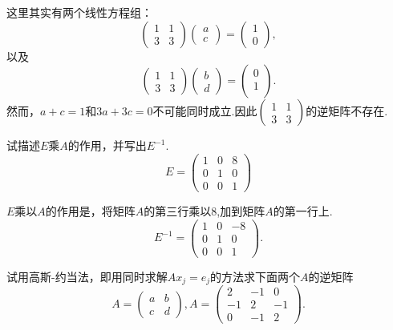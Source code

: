 ﻿\documentclass{book} \usepackage{exsheets} \usepackage{xeCJK}
\begin{document}
\begin{solution}
  这里其实有两个线性方程组：
$$
\begin{pmatrix}
  1&1\\
  3&3
\end{pmatrix}
\begin{pmatrix}
  a\\
  c
\end{pmatrix}=
\begin{pmatrix}
  1\\
  0
\end{pmatrix},
$$
以及
$$
\begin{pmatrix}
  1&1\\
  3&3
\end{pmatrix}
\begin{pmatrix}
  b\\
  d
\end{pmatrix}=
\begin{pmatrix}
  0\\
  1\\
\end{pmatrix}.
$$
然而，$a+c=1$和$3a+3c=0$不可能同时成立.因此$
\begin{pmatrix}
  1&1\\
  3&3
\end{pmatrix}
$的逆矩阵不存在.
\end{solution}
\begin{question}
  试描述$E$乘$A$的作用，并写出$E^{-1}$.
$$
E=
\begin{pmatrix}
  1&0&8\\
  0&1&0\\
  0&0&1
\end{pmatrix}
$$
\end{question}
\begin{solution}
  $E$乘以$A$的作用是，将矩阵$A$的第三行乘以$8$,加到矩阵$A$的第一行上.
$$
E^{-1}=
\begin{pmatrix}
  1&0&-8\\
  0&1&0\\
  0&0&1
\end{pmatrix}.
$$
\end{solution}
\begin{question}
  试用高斯-约当法，即用同时求解$Ax_j=e_j$的方法求下面两个$A$的逆矩阵
$$
A=
\begin{pmatrix}
  a&b\\
  c&d
\end{pmatrix},A=
\begin{pmatrix}
  2&-1&0\\
  -1&2&-1\\
  0&-1&2
\end{pmatrix}.
$$
\end{question}
\end{document}
